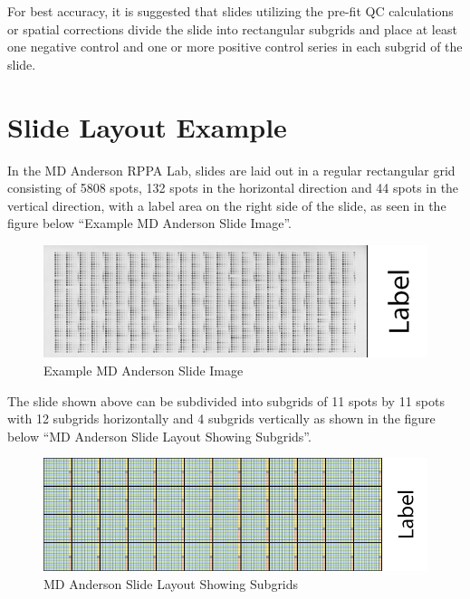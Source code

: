 \documentclass[
]{article}
\begin{document}
For best accuracy, it is suggested that slides utilizing the pre-fit QC
calculations or spatial corrections divide the slide into rectangular
subgrids and place at least one negative control and one or more
positive control series in each subgrid of the slide.

\hypertarget{layout_example}{%
\section{Slide Layout Example}\label{layout_example}}

In the MD Anderson RPPA Lab, slides are laid out in a regular
rectangular grid consisting of 5808 spots, 132 spots in the horizontal
direction and 44 spots in the vertical direction, with a label area on
the right side of the slide, as seen in the figure below ``Example MD
Anderson Slide Image''.

\begin{figure}

{\centering \includegraphics[width=0.9\linewidth]{images/example_slide} 

}

\caption{Example MD Anderson Slide Image}\label{fig:unnamed-chunk-3}
\end{figure}

The slide shown above can be subdivided into subgrids of 11 spots by 11
spots with 12 subgrids horizontally and 4 subgrids vertically as shown
in the figure below ``MD Anderson Slide Layout Showing Subgrids''.

\begin{figure}

{\centering \includegraphics[width=0.9\linewidth]{images/example_slide_with_subgrids} 

}

\caption{MD Anderson Slide Layout Showing Subgrids}\label{fig:unnamed-chunk-4}
\end{figure}
\end{document}
